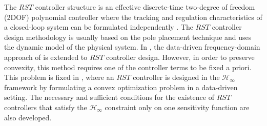 \documentclass[journal]{IEEEtran}
\begin{document}


The $RST$ controller structure is an effective discrete-time two-degree of freedom (2DOF) polynomial controller where the tracking and regulation characteristics of a closed-loop system can be formulated independently \cite{LZ06}. 
The $RST$ controller design methodology is usually based on the pole placement technique and uses the dynamic model of the physical system. In \cite{GKL11}, the data-driven frequency-domain approach of \cite{KG10} is extended to $RST$ controller design. However, in order to preserve convexity, this method requires one of the controller terms to be fixed a priori. This problem is fixed in \cite{NEK15}, where an $RST$ controller is designed in the $\mathcal{H}_{\infty}$ framework by formulating a convex optimization problem in a data-driven setting. The necessary and sufficient conditions for the existence of $RST$ controllers that satisfy the  $\mathcal{H}_{\infty}$ constraint only on one sensitivity function are also developed. 
\end{document}
